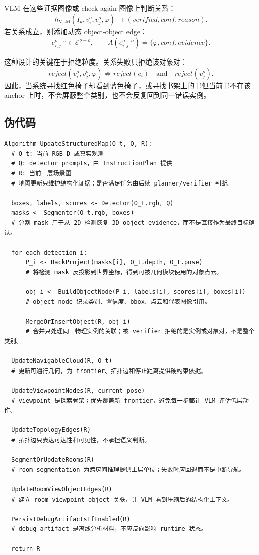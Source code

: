 \documentclass[UTF8,zihao=-4]{ctexart}
\begin{document}
VLM 在这些证据图像或 check-again 图像上判断关系：
\begin{equation}
  h_{\mathrm{VLM}}(I_k,v_i^o,v_j^o,\varphi)
  \rightarrow
  (verified,conf,reason).
\end{equation}
若关系成立，则添加动态 object-object edge：
\begin{equation}
  e_{i,j}^{o-o}\in\mathcal{E}^{o-o},
  \qquad
  A(e_{i,j}^{o-o})=\{\varphi,conf,evidence\}.
  \label{eq:dynamic_edge}
\end{equation}

这种设计的关键在于拒绝粒度。关系失败只拒绝该对象对：
\begin{equation}
  reject(v_i^o,v_j^o,\varphi)
  \not\Rightarrow
  reject(c_i)
  \quad \text{and} \quad
  reject(v_j^o).
\end{equation}
因此，当系统寻找红色椅子却看到蓝色椅子，或寻找书架上的书但当前书不在该
anchor 上时，不会屏蔽整个类别，也不会反复回到同一错误实例。

\subsection{伪代码}

\begin{lstlisting}[style=pseudo,caption={结构化地图更新}]
Algorithm UpdateStructuredMap(O_t, Q, R):
  # O_t: 当前 RGB-D 或真实观测
  # Q: detector prompts，由 InstructionPlan 提供
  # R: 当前三层场景图
  # 地图更新只维护结构化证据；是否满足任务由后续 planner/verifier 判断。

  boxes, labels, scores <- Detector(O_t.rgb, Q)
  masks <- Segmenter(O_t.rgb, boxes)
  # 分割 mask 用于从 2D 检测恢复 3D object evidence，而不是直接作为最终目标确认。

  for each detection i:
      P_i <- BackProject(masks[i], O_t.depth, O_t.pose)
      # 将检测 mask 反投影到世界坐标，得到可被几何模块使用的对象点云。

      obj_i <- BuildObjectNode(P_i, labels[i], scores[i], boxes[i])
      # object node 记录类别、置信度、bbox、点云和代表图像引用。

      MergeOrInsertObject(R, obj_i)
      # 合并只处理同一物理实例的关联；被 verifier 拒绝的是实例或对象对，不是整个类别。

  UpdateNavigableCloud(R, O_t)
  # 更新可通行几何，为 frontier、拓扑边和停止距离提供硬约束依据。

  UpdateViewpointNodes(R, current_pose)
  # viewpoint 是探索骨架；优先覆盖新 frontier，避免每一步都让 VLM 评估低层动作。

  UpdateTopologyEdges(R)
  # 拓扑边只表达可达性和可见性，不承担语义判断。

  SegmentOrUpdateRooms(R)
  # room segmentation 为跨房间推理提供上层单位；失败时应回退而不是中断导航。

  UpdateRoomViewObjectEdges(R)
  # 建立 room-viewpoint-object 关联，让 VLM 看到压缩后的结构化上下文。

  PersistDebugArtifactsIfEnabled(R)
  # debug artifact 是离线分析材料，不应反向影响 runtime 状态。

  return R
\end{lstlisting}
\end{document}

